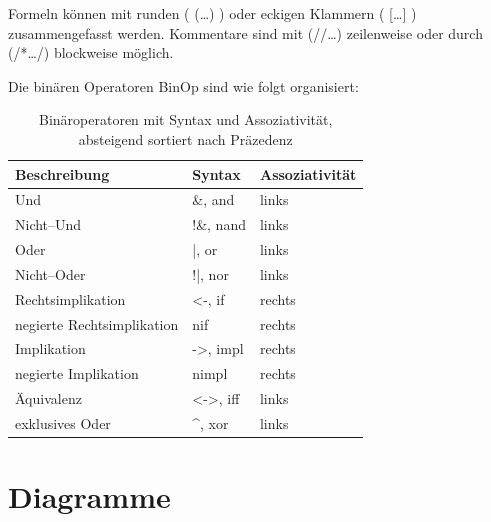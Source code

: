 \documentclass[ngerman,a4paper,abstracton,open=right,twoside=false,toc=listofnumbered,bibtotocnumbered]{scrreprt}
\begin{document}
Formeln können mit runden ( (\dots) ) oder eckigen Klammern ( [\dots] ) zusammengefasst werden. Kommentare sind mit (//\dots) zeilenweise oder durch (/*\dots */) blockweise möglich.

Die binären Operatoren \glqq{}BinOp\grqq{} sind wie folgt organisiert:

\begin{table}[h]
	\begin{tabular}{|l|l|l|}
		\hline
		\textbf{Beschreibung} & \textbf{Syntax} & \textbf{Assoziativität} \\
		\hline
		Und & \&, and & links \\ \hline
		Nicht--Und & !\&, nand & links \\ \hline
		Oder & |, or & links \\ \hline
		Nicht--Oder & !|, nor & links \\ \hline
		Rechtsimplikation & <-, if & rechts \\ \hline
		negierte Rechtsimplikation & nif & rechts \\ \hline
		Implikation & ->, impl & rechts \\ \hline
		negierte Implikation & nimpl & rechts \\ \hline
		Äquivalenz & <->, iff & links \\ \hline
		exklusives Oder & \textasciicircum, xor & links \\ \hline
	\end{tabular}
	\caption{Binäroperatoren mit Syntax und Assoziativität, absteigend sortiert nach Präzedenz}
\end{table}

\newpage
\section{Diagramme}
\end{document}
